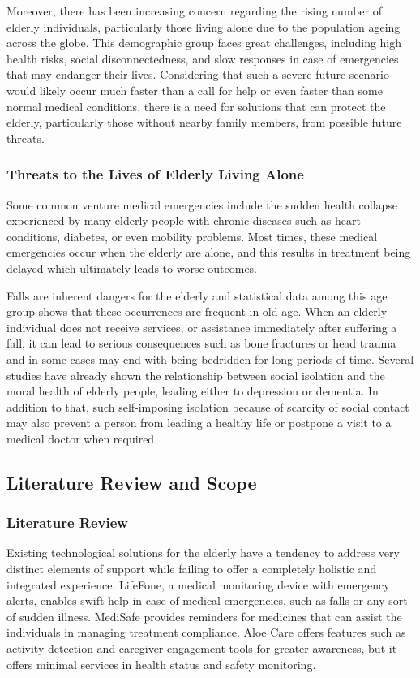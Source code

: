 \documentclass[a4paper, 12pt]{article}
\begin{document}
Moreover, there has been increasing concern regarding the rising number of elderly individuals, particularly those living alone due to the population ageing across the globe. This demographic group faces great challenges, including high health risks, social disconnectedness, and slow responses in case of emergencies that may endanger their lives. Considering that such a severe future scenario would likely occur much faster than a call for help or even faster than some normal medical conditions, there is a need for solutions that can protect the elderly, particularly those without nearby family members, from possible future threats.

\subsubsection{Threats to the Lives of Elderly Living Alone}

Some common venture medical emergencies include the sudden health collapse experienced by many elderly people with chronic diseases such as heart conditions, diabetes, or even mobility problems. Most times, these medical emergencies occur when the elderly are alone, and this results in treatment being delayed which ultimately leads to worse outcomes.

Falls are inherent dangers for the elderly and statistical data among this age group shows that these occurrences are frequent in old age. When an elderly individual does not receive services, or assistance immediately after suffering a fall, it can lead to serious consequences such as bone fractures or head trauma and in some cases may end with being bedridden for long periods of time.
Several studies have already shown the relationship between social isolation and the moral health of elderly people, leading either to depression or dementia. In addition to that, such self-imposing isolation because of scarcity of social contact may also prevent a person from leading a healthy life or postpone a visit to a medical doctor when required.

\subsection{Literature Review and Scope}
\subsubsection{Literature Review}

Existing technological solutions for the elderly have a tendency to address very distinct elements of support while failing to offer a completely holistic and integrated experience. LifeFone, a medical monitoring device with emergency alerts, enables swift help in case of medical emergencies, such as falls or any sort of sudden illness.  MediSafe provides reminders for medicines that can assist the individuals in managing treatment compliance.  Aloe Care offers features such as activity detection and caregiver engagement tools for greater awareness, but it offers minimal services in health status and safety monitoring.
\end{document}
